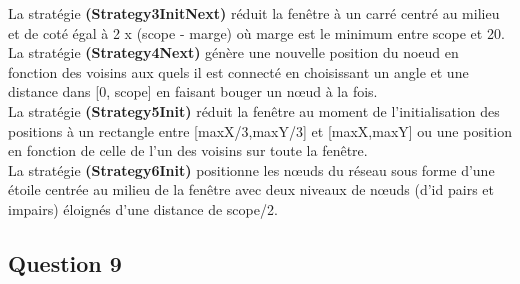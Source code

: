 \documentclass[10pt]{report}
\begin{document}
La stratégie \textbf{(Strategy3InitNext)} réduit la fenêtre à un carré centré au milieu et de coté égal à 2 x (scope - marge) où marge est le minimum entre scope et 20.\\

La stratégie \textbf{(Strategy4Next)} génère une nouvelle position du noeud en fonction des voisins aux quels il est connecté en choisissant un angle et une distance dans [0, scope] en faisant bouger un nœud à la fois.\\

La stratégie \textbf{(Strategy5Init)} réduit la fenêtre au moment de l'initialisation des positions à un rectangle entre [maxX/3,maxY/3] et [maxX,maxY] ou une position en fonction de celle de l'un des voisins sur toute la fenêtre.\\

La stratégie \textbf{(Strategy6Init)} positionne les nœuds du réseau sous forme d'une étoile centrée au milieu de la fenêtre avec deux niveaux de nœuds (d'id pairs et impairs) éloignés d'une distance de scope/2.\\

\subsection{Question 9}
\end{document}
